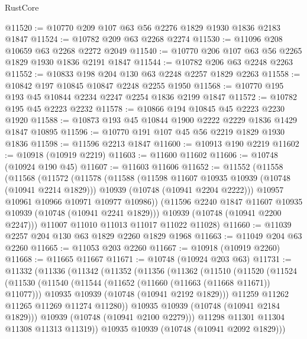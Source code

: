 \begin{lexlean}{RustCore}
\begin{coremodule}
@11520 := @10770 @209 @107 @63 @56 @2276 @1829 @1930 @1836 @2183 @1847
@11524 := @10782 @209 @63 @2268 @2274
@11530 := @11096 @208 @10659 @63 @2268 @2272 @2049
@11540 := @10770 @206 @107 @63 @56 @2265 @1829 @1930 @1836 @2191 @1847
@11544 := @10782 @206 @63 @2248 @2263
@11552 := @10833 @198 @204 @130 @63 @2248 @2257 @1829 @2263
@11558 := @10842 @197 @10845 @10847 @2248 @2255 @1950
@11568 := @10770 @195 @193 @45 @10844 @2234 @2247 @2254 @1836 @2199 @1847
@11572 := @10782 @195 @45 @2223 @2232
@11578 := @10866 @194 @10845 @45 @2223 @2230 @1920
@11588 := @10873 @193 @45 @10844 @1900 @2222 @2229 @1836 @1429 @1847 @10895
@11596 := @10770 @191 @107 @45 @56 @2219 @1829 @1930 @1836
@11598 := @11596 @2213 @1847
@11600 := @10913 @190 @2219
@11602 := @10918 (@10919 @2219)
@11603 := @11600 @11602
@11606 := @10748 (@10924 @190 @45)
@11607 := @11603 @11606
@11652 := @11552
    (@11558
      (@11568
        (@11572
          (@11578
            (@11588
              (@11598 @11607 @10935 @10939 (@10748 (@10941 @2214 @1829)))
              @10939
              (@10748 (@10941 @2204 @2222)))
            @10957
            @10961
            @10966
            @10971
            @10977
            @10986))
        (@11596 @2240 @1847 @11607 @10935 @10939 (@10748 (@10941 @2241 @1829)))
        @10939
        (@10748 (@10941 @2200 @2247)))
      @11007
      @11010
      @11013
      @11017
      @11022
      @11028)
@11660 := @11039 @2257 @204 @130 @63 @1829 @2260 @1829 @1968
@11663 := @11049 @204 @63 @2260
@11665 := @11053 @203 @2260
@11667 := @10918 (@10919 @2260)
@11668 := @11665 @11667
@11671 := @10748 (@10924 @203 @63)
@11731 := @11332
    (@11336
      (@11342
        (@11352
          (@11356
            (@11362
              (@11510
                (@11520
                  (@11524
                    (@11530
                      (@11540
                        (@11544 (@11652 (@11660 (@11663 (@11668 @11671)) @11077)))
                        @10935
                        @10939
                        (@10748 (@10941 @2192 @1829)))
                      @11259
                      @11262
                      @11265
                      @11269
                      @11274
                      @11280))
                  @10935
                  @10939
                  (@10748 (@10941 @2184 @1829)))
                @10939
                (@10748 (@10941 @2100 @2279)))
              @11298
              @11301
              @11304
              @11308
              @11313
              @11319))
          @10935
          @10939
          (@10748 (@10941 @2092 @1829)))

\end{coremodule}
\end{lexlean}
